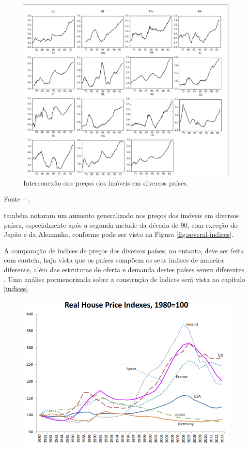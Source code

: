 \documentclass[
	12pt,				%
	oneside,			%
	a4paper,			%
	chapter=TITLE,		%
	section=TITLE,		%
	english,			%
	brazil				%
	]{abntex2}
\newcommand{\bcenter}{\begin{center}}
\newcommand{\ecenter}{\end{center}}
\begin{document}
\begin{refsection}
\begin{figure}[H]
{\centering \includegraphics[width=\textwidth]{./images/adams2_crop} 

}

\caption{Interconexão dos preços dos imóveis em diversos países.}\label{fig:adams2}
\end{figure}
\bcenter

\small Fonte -- \textcite{ADAMS2010}.
\ecenter

\textcite{regulation} também notaram um aumento generalizado nos preços dos imóveis em
diversos países, especialmente após a segunda metade da década de 90, com
exceção do Japão e da Alemanha, conforme pode ser visto na Figura
\ref{fig:several-indices}.

A comparação de índices de preços dos diversos países, no entanto, deve ser
feita com cautela, haja vista que os países compõem os seus índices de maneira
diferente, além das estruturas de oferta e demanda destes países serem
diferentes \autocites[ver][p.~4]{regulation}{silver}. Uma análise pormenorizada sobre a
construção de índices será vista no capítulo \ref{indices}.
\begin{figure}[H]

{\centering \includegraphics[width=0.7\linewidth]{images/several_indices_regulations} 

}
\end{figure}
\end{refsection}
\end{document}
